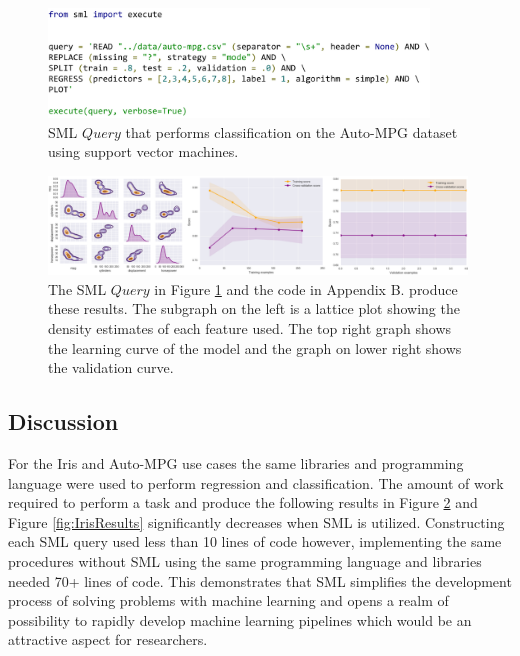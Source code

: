 \documentclass[jair,twoside,11pt,theapa]{article}
\begin{document}
\begin{figure}
\includegraphics[width=0.9\textwidth]{figs/autompg_sml.png}
\centering
\caption{SML \(Query\) that performs classification on the Auto-MPG dataset using support vector machines.}
\label{fig:SML:AutoMPGQuery}
\end{figure}

\begin{figure}
\includegraphics[width=0.99\textwidth]{figs/auto-mpg-results.png}
\centering
\caption{The SML \(Query\) in Figure \ref{fig:SML:AutoMPGQuery}  and the code in Appendix B. produce these results. The subgraph on the left is a lattice plot showing the density estimates of each feature used. The top right graph shows the learning curve of the model and the graph on lower right shows the validation curve.}
\label{fig:AutoMPG:Results}
\end{figure}

\subsection{Discussion}
For the Iris and Auto-MPG use cases the same libraries and programming language were used to perform regression and classification. The amount of work required to perform a task and produce the following results in Figure \ref{fig:AutoMPG:Results} and Figure \ref{fig:IrisResults} significantly decreases when SML is utilized. Constructing each SML query used less than 10 lines of code however, implementing the same procedures without SML using the same programming language and libraries needed 70+ lines of code. This demonstrates that SML simplifies the development process of solving problems with machine learning and opens a realm of possibility to rapidly develop machine learning pipelines which would be an attractive aspect for researchers.
\end{document}
